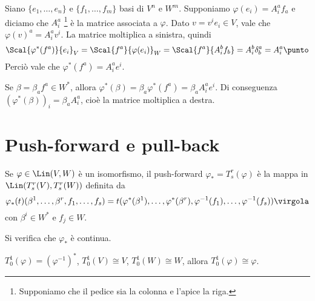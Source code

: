 Siano $\{e_1,\ldots, e_n\}$ e $\{f_1,\ldots, f_m\}$ basi di $V^n$ e $W^m$. Supponiamo $\varphi(e_i) = A_i^af_a$ e diciamo che $A_i^a$ \footnote{Supponiamo che il pedice sia la colonna e l'apice la riga.} è la matrice associata a $\varphi$.
Dato $v = v^ie_i\in V$, vale che $\varphi(v)^a = A_i^a v^i$.
La matrice moltiplica a sinistra, quindi
\begin{equation*}
	\Scal{\varphi^*(f^a)}{e_i}_V = \Scal{f^a}{\varphi(e_i)}_W = \Scal{f^a}{A_i^b f_b} = A_i^b\delta_b^a = A_i^a\punto
\end{equation*}
Perciò vale che $\varphi^*(f^a) = A_i^a e^i$.

Se $\beta = \beta_a f^a \in W^*$, allora $\varphi^*(\beta) = \beta_a \varphi^*(f^a) = \beta_aA_i^ae^i$.
Di conseguenza $(\varphi^*(\beta))_i = \beta_aA_i^a$, cioè la matrice moltiplica a destra.

\section{Push-forward e pull-back}

\begin{definition} 
	Se $\varphi \in \Lin(V,W)$ è un isomorfismo, il push-forward $\varphi_* = T_s^r(\varphi)$ è la mappa in $\Lin(T_s^r(V), T_s^r(W))$ definita da
	\begin{equation*}
		\varphi_*(t) (\beta^1,\ldots,\beta^r,f_1,\ldots,f_s) = t(\varphi^*(\beta^1),\ldots,\varphi^*(\beta^r), \varphi^{-1}(f_1),\ldots, \varphi^{-1}(f_s)) \virgola
	\end{equation*}
	con $\beta^i\in W^*$ e $f_j\in W$.
\end{definition}

Si verifica che $\varphi_*$ è continua.

\begin{remark} %
	$T_0^1(\varphi) = (\varphi^{-1})^*$, $T_0^1(V)\cong V$, $T_0^1(W)\cong W$, allora $T_0^1(\varphi)\cong\varphi$.
\end{remark}

